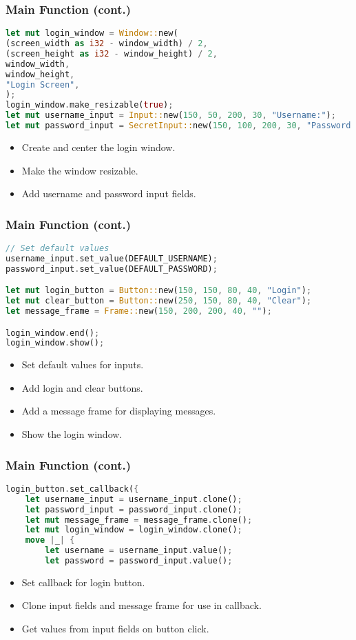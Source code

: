 \documentclass[aspectratio=169, table]{beamer}
\begin{document}
\begin{frame}[fragile]
\frametitle{Main Function (cont.)}
\vspace{15pt}
\begin{lstlisting}[language=Rust]
let mut login_window = Window::new(
(screen_width as i32 - window_width) / 2,
(screen_height as i32 - window_height) / 2,
window_width,
window_height,
"Login Screen",
);
login_window.make_resizable(true);
let mut username_input = Input::new(150, 50, 200, 30, "Username:");
let mut password_input = SecretInput::new(150, 100, 200, 30, "Password:");
\end{lstlisting}
\begin{itemize}
\item Create and center the login window.
\item Make the window resizable.
\item Add username and password input fields.
\end{itemize}
\end{frame}

\begin{frame}[fragile]
\frametitle{Main Function (cont.)}
\vspace{15pt}
\begin{lstlisting}[language=Rust]
// Set default values
username_input.set_value(DEFAULT_USERNAME);
password_input.set_value(DEFAULT_PASSWORD);

let mut login_button = Button::new(150, 150, 80, 40, "Login");
let mut clear_button = Button::new(250, 150, 80, 40, "Clear");
let message_frame = Frame::new(150, 200, 200, 40, "");

login_window.end();
login_window.show();
\end{lstlisting}
\begin{itemize}
\item Set default values for inputs.
\item Add login and clear buttons.
\item Add a message frame for displaying messages.
\item Show the login window.
\end{itemize}
\end{frame}

\begin{frame}[fragile]
\frametitle{Main Function (cont.)}
\begin{lstlisting}[language=Rust]
login_button.set_callback({
	let username_input = username_input.clone();
	let password_input = password_input.clone();
	let mut message_frame = message_frame.clone();
	let mut login_window = login_window.clone();
	move |_| {
		let username = username_input.value();
		let password = password_input.value();
	\end{lstlisting}
	\begin{itemize}
		\item Set callback for login button.
		\item Clone input fields and message frame for use in callback.
		\item Get values from input fields on button click.
	\end{itemize}
\end{frame}
\end{document}
